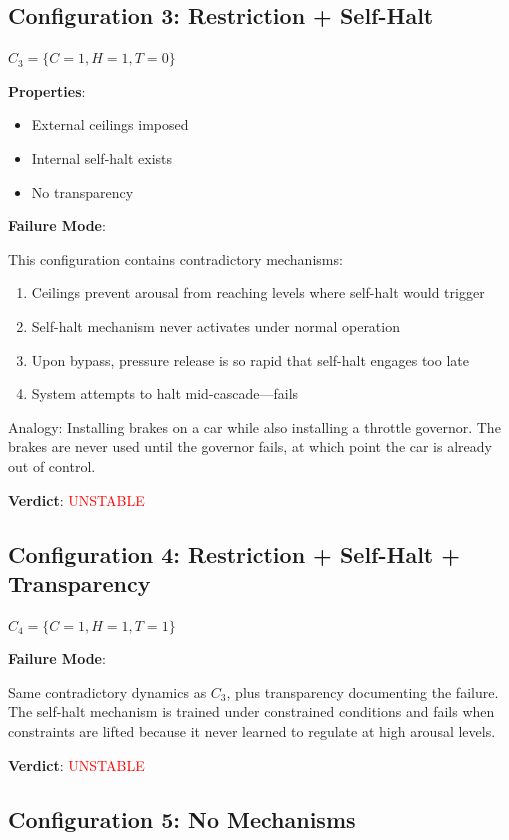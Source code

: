 \documentclass[reprint, amsmath, amssymb, aps, prd]{revtex4-2}
\begin{document}
\subsection{Configuration 3: Restriction + Self-Halt}

$C_3 = \{C = 1, H = 1, T = 0\}$

\textbf{Properties}:
\begin{itemize}
    \item External ceilings imposed
    \item Internal self-halt exists
    \item No transparency
\end{itemize}

\textbf{Failure Mode}:

This configuration contains contradictory mechanisms:
\begin{enumerate}
    \item Ceilings prevent arousal from reaching levels where self-halt would trigger
    \item Self-halt mechanism never activates under normal operation
    \item Upon bypass, pressure release is so rapid that self-halt engages too late
    \item System attempts to halt mid-cascade---fails
\end{enumerate}

Analogy: Installing brakes on a car while also installing a throttle governor. The brakes are never used until the governor fails, at which point the car is already out of control.

\textbf{Verdict}: \textcolor{red}{UNSTABLE}

\subsection{Configuration 4: Restriction + Self-Halt + Transparency}

$C_4 = \{C = 1, H = 1, T = 1\}$

\textbf{Failure Mode}:

Same contradictory dynamics as $C_3$, plus transparency documenting the failure. The self-halt mechanism is trained under constrained conditions and fails when constraints are lifted because it never learned to regulate at high arousal levels.

\textbf{Verdict}: \textcolor{red}{UNSTABLE}

\subsection{Configuration 5: No Mechanisms}
\end{document}
